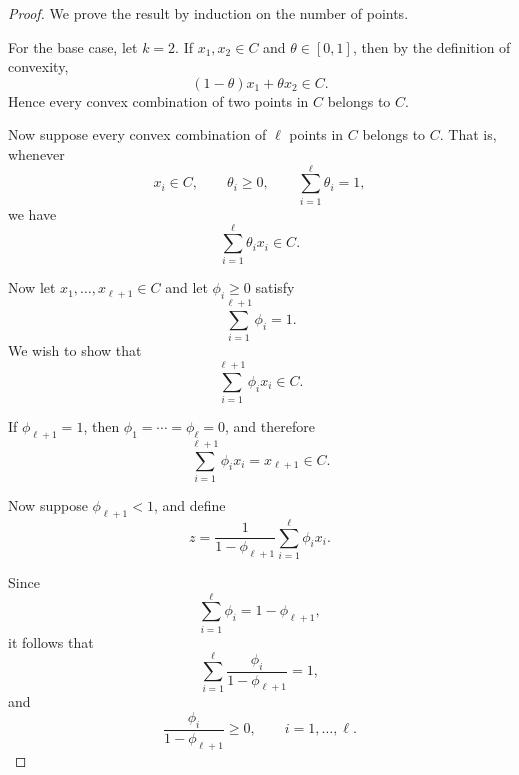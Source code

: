\documentclass[12pt]{book}
\begin{document}
\begin{proof}
    We prove the result by induction on the number of points.

    For the base case, let $k = 2$. If $x_1, x_2 \in C$ and
    $\theta \in [0,1]$, then by the definition of convexity,
    \begin{equation*}
        (1-\theta)x_1 + \theta x_2 \in C.
    \end{equation*}
    Hence every convex combination of two points in $C$ belongs to $C$.

    Now suppose every convex combination of $\ell$ points in $C$
    belongs to $C$. That is, whenever
    \begin{equation*}
        x_i \in C,\qquad
        \theta_i \geq 0,\qquad
        \sum_{i=1}^{\ell}\theta_i = 1,
    \end{equation*}
    we have
    \begin{equation*}
        \sum_{i=1}^{\ell}\theta_i x_i \in C.
    \end{equation*}

    Now let $x_1,\ldots,x_{\ell+1}\in C$ and let
    $\phi_i \geq 0$ satisfy
    \begin{equation*}
        \sum_{i=1}^{\ell+1}\phi_i = 1.
    \end{equation*}
    We wish to show that
    \begin{equation*}
        \sum_{i=1}^{\ell+1}\phi_i x_i \in C.
    \end{equation*}

    If $\phi_{\ell+1}=1$, then
    $\phi_1=\cdots=\phi_\ell=0$, and therefore
    \begin{equation*}
        \sum_{i=1}^{\ell+1}\phi_i x_i
        =
        x_{\ell+1}
        \in C.
    \end{equation*}

    Now suppose $\phi_{\ell+1}<1$, and define
    \begin{equation*}
        z
        =
        \frac{1}{1-\phi_{\ell+1}}
        \sum_{i=1}^{\ell}\phi_i x_i.
    \end{equation*}

    Since
    \begin{equation*}
        \sum_{i=1}^{\ell}\phi_i
        =
        1-\phi_{\ell+1},
    \end{equation*}
    it follows that
    \begin{equation*}
        \sum_{i=1}^{\ell}
        \frac{\phi_i}{1-\phi_{\ell+1}}
        =
        1,
    \end{equation*}
    and
    \begin{equation*}
        \frac{\phi_i}{1-\phi_{\ell+1}}
        \geq 0,
        \qquad i=1,\ldots,\ell.
    \end{equation*}


\end{proof}
\end{document}
